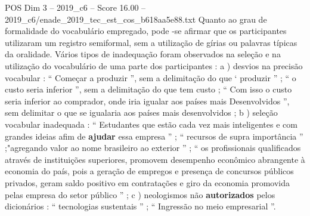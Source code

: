 \begin{textsample}{POS Dim 3 – 2019\_c6 – Score 16.00 – 2019\_c6/enade\_2019\_tec\_est\_cos\_b618aa5e88.txt}
Quanto ao grau de formalidade do vocabulário empregado, pode -se afirmar que os participantes utilizaram um registro semiformal, sem a utilização de gírias ou palavras típicas da oralidade.
Vários tipos de inadequação foram observados na seleção e na utilização do vocabulário de uma parte dos participantes : a ) desvios na precisão vocabular : “ Começar a produzir ”, sem a delimitação do que ‘ produzir ” ; “ o custo seria inferior ”, sem a delimitação do que tem custo ; “ Com isso o custo seria inferior ao comprador, onde iria igualar aos países mais Desenvolvidos ”, sem delimitar o que se igualaria aos países mais desenvolvidos ; b ) seleção vocabular inadequada : “ Estudantes que estão cada vez mais inteligentes e com grandes ideias afim de \textbf{ajudar} essa empresa ” ; “ recursos de supra importância ” ;"agregando valor ao nome brasileiro ao exterior ” ; “ os profissionais qualificados através de instituições superiores, promovem desempenho econômico abrangente à economia do país, pois a geração de empregos e presença de concursos públicos privados, geram saldo positivo em contratações e giro da economia promovida pelas empresa do setor público ” ; c ) neologismos não \textbf{autorizados} pelos dicionários : “ tecnologias sustentais ” ; “ Ingressão no meio empresarial ”.

\end{textsample}
